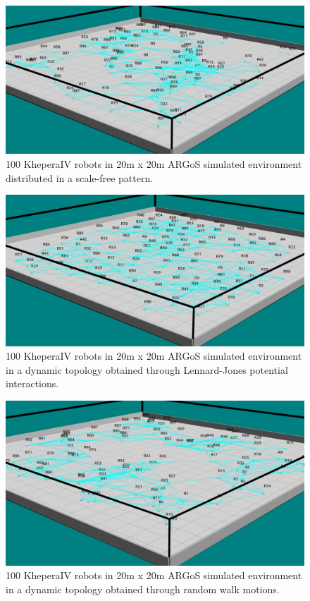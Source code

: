 \begin{figure}[H]
	\centering
    \includegraphics[width=\columnwidth]{images/argos_scale_free.png}
    \caption[Scale-free formation in ARGoS]{100 KheperaIV robots in 20m x 20m  ARGoS simulated environment distributed in a scale-free pattern.}
    \label{argos:scale-free}
\end{figure}

\begin{figure}[H]
	\centering
    \includegraphics[width=\columnwidth]{images/argos_lennard.png}
    \caption[Lennard-Jones potential formation in ARGoS]{100 KheperaIV robots in 20m x 20m  ARGoS simulated environment in a dynamic topology obtained through Lennard-Jones potential interactions.}
    \label{argos:lennard-jones}
\end{figure}

\begin{figure}[H]
	\centering
    \includegraphics[width=\columnwidth]{images/argos_random.png}
    \caption[Random formation in ARGoS]{100 KheperaIV robots in 20m x 20m  ARGoS simulated environment in a dynamic topology obtained through random walk motions.}
    \label{argos:random-walk}
\end{figure}


